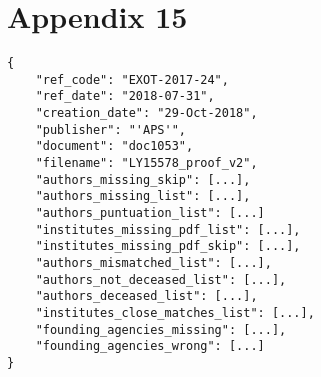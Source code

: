 \section*{Appendix 15}
\label{sec:app15}

\begin{lstlisting}
{
    "ref_code": "EXOT-2017-24",
    "ref_date": "2018-07-31", 
    "creation_date": "29-Oct-2018",
    "publisher": "'APS'", 
    "document": "doc1053",
    "filename": "LY15578_proof_v2", 
    "authors_missing_skip": [...], 
    "authors_missing_list": [...],
    "authors_puntuation_list": [...]
    "institutes_missing_pdf_list": [...], 
    "institutes_missing_pdf_skip": [...], 
    "authors_mismatched_list": [...], 
    "authors_not_deceased_list": [...], 
    "authors_deceased_list": [...], 
    "institutes_close_matches_list": [...], 
    "founding_agencies_missing": [...],
    "founding_agencies_wrong": [...]
}
\end{lstlisting}